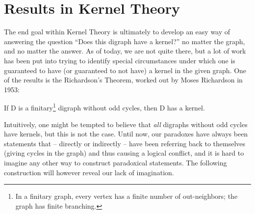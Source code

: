 \section{Results in Kernel Theory}
\label{sec:Results in Kernel Theory}
The end goal within Kernel Theory is ultimately to develop an easy way of answering the question ``Does this digraph have a kernel?'' no matter the graph, and no matter the answer.
As of today, we are not quite there, but a lot of work has been put into trying to identify special circumstances under which one is guaranteed to have (or guaranteed to not have) a kernel in the given graph.
One of the results is the Richardson's Theorem\cite{am-richardson}, worked out by Moses Richardson in 1953:\\

\begin{theorem}
  If D is a finitary\footnote{In a finitary graph, every vertex has a finite number of out-neighbors; the graph has finite branching.} digraph without odd cycles, then D has a kernel.
\end{theorem}

Intuitively, one might be tempted to believe that \textit{all} digraphs without odd cycles have kernels, but this is not the case.
Until now, our paradoxes have always been statements that -- directly or indirectly -- have been referring back to themselves (giving cycles in the graph) and thus causing a logical conflict, and it is hard to imagine any other way to construct paradoxical statements.
The following construction will however reveal our lack of imagination.


